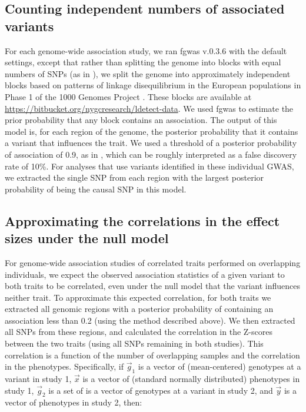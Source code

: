\documentclass[11pt,titlepage]{article}
\begin{document}
\subsection{Counting independent numbers of associated variants}
For each genome-wide association study, we ran fgwas v.0.3.6 \citep{pickrell2013joint} with the default settings, except that rather than splitting the genome into blocks with equal numbers of SNPs (as in \citet{pickrell2013joint}), we split the genome into approximately independent blocks based on patterns of linkage disequilibrium in the European populations in Phase 1 of the 1000 Genomes Project \citep{abecasis2010map}. These blocks are available at \url{https://bitbucket.org/nygcresearch/ldetect-data}. We used fgwas to estimate the prior probability that any block contains an association. The output of this model is, for each region of the genome, the posterior probability that it contains a variant that influences the trait. We used a threshold of a posterior probability of association of 0.9, as in \citet{pickrell2013joint}, which can be roughly interpreted as a false discovery rate of 10\%. For analyses that use variants identified in these individual GWAS, we extracted the single SNP from each region with the largest posterior probability of being the causal SNP in this model. 

\subsection{Approximating the correlations in the effect sizes under the null model} \label{cor}
For genome-wide association studies of correlated traits performed on overlapping individuals, we expect the observed association statistics of a given variant to both traits to be correlated, even under the null model that the variant influences neither trait. To approximate this expected correlation, for both traits we extracted all genomic regions with a posterior probability of containing an association less than 0.2 (using the method described above). We then extracted all SNPs from these regions, and calculated the correlation in the Z-scores between the two traits (using all SNPs remaining in both studies). This correlation is a function of the number of overlapping samples and the correlation in the phenotypes. Specifically, if $\vec g_1$ is a vector of (mean-centered) genotypes at a variant in study 1, $\vec x$ is a vector of (standard normally distributed) phenotypes in study 1, $\vec g_2$ is a set of is a vector of genotypes at a variant in study 2, and $\vec y$ is a vector of phenotypes in study 2, then: 
\end{document}
